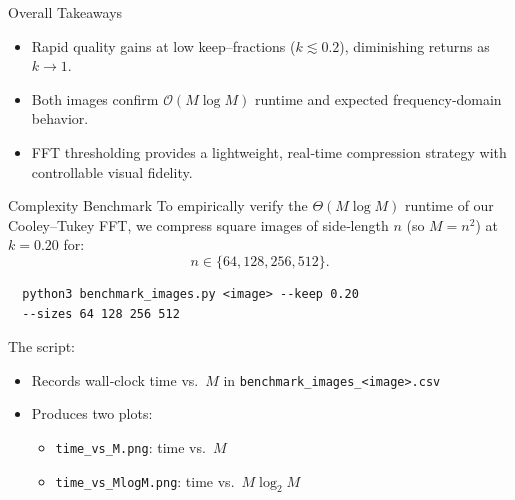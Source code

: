 \documentclass[12pt]{beamer}
\begin{document}
\begin{frame}{Overall Takeaways}
  \begin{itemize}
    \item Rapid quality gains at low keep–fractions (\(k\lesssim0.2\)), diminishing returns as \(k\to1\).
    \item Both images confirm \(\mathcal{O}(M\log M)\) runtime and expected frequency‐domain behavior.
    \item FFT thresholding provides a lightweight, real‐time compression strategy with controllable visual fidelity.
  \end{itemize}
\end{frame}



\begin{frame}[fragile]{Complexity Benchmark}
 To empirically verify the \(\Theta(M\log M)\) runtime of our Cooley–Tukey FFT, we compress square images of side‑length \(n\) (so \(M=n^2\)) at \(k=0.20\) for:
  \[
    n\in\{64,128,256,512\}.
  \]
  \medskip
  \begin{verbatim}
  python3 benchmark_images.py <image> --keep 0.20 
  --sizes 64 128 256 512
  \end{verbatim}
  \medskip
  The script:
  \begin{itemize}
    \item Records wall‑clock time vs.\ \(M\) in \texttt{benchmark\_images\_<image>.csv}
    \item Produces two plots:
      \begin{itemize}
        \item \texttt{time\_vs\_M.png}: time vs.\ \(M\)
        \item \texttt{time\_vs\_MlogM.png}: time vs.\ \(M\log_2 M\)
      \end{itemize}
  \end{itemize}
\end{frame}
\end{document}
